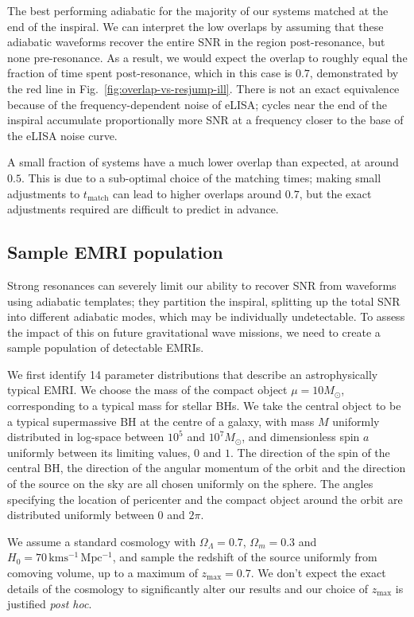 \documentclass[aps,prd,amsfonts,amssymb,amsmath,nofootinbib,reprint,showpacs,superscriptaddress,twocolumn]{revtex4}
\newcommand{\figref}[1]{Fig.\ \ref{fig:#1}}
\begin{document}
The best performing adiabatic for the majority of our systems matched at the end of the inspiral. We can interpret the low overlaps by assuming that these adiabatic waveforms recover the entire SNR in the region post-resonance, but none pre-resonance. As a result, we would expect the overlap to roughly equal the fraction of time spent post-resonance, which in this case is $0.7$, demonstrated by the red line in \figref{overlap-vs-resjump-ill}. There is not an exact equivalence because of the frequency-dependent noise of eLISA; cycles near the end of the inspiral accumulate proportionally more SNR at a frequency closer to the base of the eLISA noise curve.

A small fraction of systems have a much lower overlap than expected, at around $0.5$. This is due to a sub-optimal choice of the matching times; making small adjustments to $t_\mathrm{match}$ can lead to higher overlaps around $0.7$, but the exact adjustments required are difficult to predict in advance.


\subsection{Sample EMRI population}

Strong resonances can severely limit our ability to recover SNR from waveforms using adiabatic templates; they partition the inspiral, splitting up the total SNR into different adiabatic modes, which may be individually undetectable. To assess the impact of this on future gravitational wave missions, we need to create a sample population of detectable EMRIs.

We first identify 14 parameter distributions that describe an astrophysically typical EMRI. We choose the mass of the compact object $\mu = 10 M_\odot$, corresponding to a typical mass for stellar BHs. We take the central object to be a typical supermassive BH at the centre of a galaxy, with mass $M$ uniformly distributed in log-space between $10^5$ and $10^7 M_\odot$, and dimensionless spin $a$ uniformly between its limiting values, $0$ and $1$. The direction of the spin of the central BH, the direction of the angular momentum of the orbit and the direction of the source on the sky are all chosen uniformly on the sphere. The angles specifying the location of pericenter and the compact object around the orbit are distributed uniformly between $0$ and $2\pi$.

We assume a standard cosmology with $\Omega_\Lambda = 0.7$, $\Omega_m = 0.3$ and $H_0 = 70\,\mathrm{km s^{-1}\, Mpc^{-1}}$, and sample the redshift of the source uniformly from comoving volume, up to a maximum of $z_\mathrm{max} = 0.7$. We don't expect the exact details of the cosmology to significantly alter our results and our choice of $z_\mathrm{max}$ is justified \textit{post hoc}.
\end{document}
